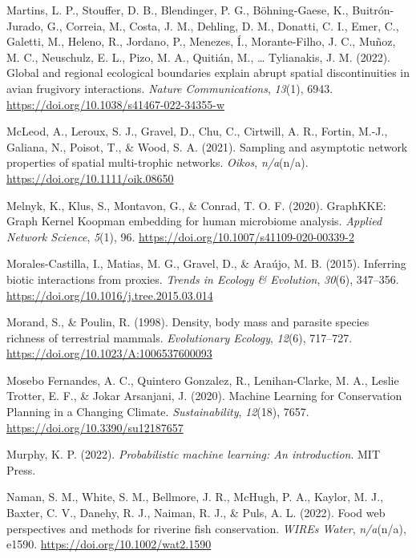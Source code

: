 \documentclass[10pt,oneside]{article}
\newlength{\cslhangindent}
\newenvironment{CSLReferences}[2] %
 {%
  \setlength{\parindent}{0pt}
  \ifodd #1 \everypar{\setlength{\hangindent}{\cslhangindent}}\ignorespaces\fi
  \ifnum #2 > 0
  \setlength{\parskip}{#2\baselineskip}
  \fi
 }%
 {}
\begin{document}
\begin{CSLReferences}{1}{0}
\leavevmode{}%
Martins, L. P., Stouffer, D. B., Blendinger, P. G., Böhning-Gaese, K.,
Buitrón-Jurado, G., Correia, M., Costa, J. M., Dehling, D. M., Donatti,
C. I., Emer, C., Galetti, M., Heleno, R., Jordano, P., Menezes, Í.,
Morante-Filho, J. C., Muñoz, M. C., Neuschulz, E. L., Pizo, M. A.,
Quitián, M., \ldots{} Tylianakis, J. M. (2022). Global and regional
ecological boundaries explain abrupt spatial discontinuities in avian
frugivory interactions. \emph{Nature Communications}, \emph{13}(1),
6943. \url{https://doi.org/10.1038/s41467-022-34355-w}

\leavevmode{}%
McLeod, A., Leroux, S. J., Gravel, D., Chu, C., Cirtwill, A. R., Fortin,
M.-J., Galiana, N., Poisot, T., \& Wood, S. A. (2021). Sampling and
asymptotic network properties of spatial multi-trophic networks.
\emph{Oikos}, \emph{n/a}(n/a). \url{https://doi.org/10.1111/oik.08650}

\leavevmode{}%
Melnyk, K., Klus, S., Montavon, G., \& Conrad, T. O. F. (2020).
GraphKKE: Graph Kernel Koopman embedding for human microbiome analysis.
\emph{Applied Network Science}, \emph{5}(1), 96.
\url{https://doi.org/10.1007/s41109-020-00339-2}

\leavevmode{}%
Morales-Castilla, I., Matias, M. G., Gravel, D., \& Araújo, M. B.
(2015). Inferring biotic interactions from proxies. \emph{Trends in
Ecology \& Evolution}, \emph{30}(6), 347--356.
\url{https://doi.org/10.1016/j.tree.2015.03.014}

\leavevmode{}%
Morand, S., \& Poulin, R. (1998). Density, body mass and parasite
species richness of terrestrial mammals. \emph{Evolutionary Ecology},
\emph{12}(6), 717--727. \url{https://doi.org/10.1023/A:1006537600093}

\leavevmode{}%
Mosebo Fernandes, A. C., Quintero Gonzalez, R., Lenihan-Clarke, M. A.,
Leslie Trotter, E. F., \& Jokar Arsanjani, J. (2020). Machine Learning
for Conservation Planning in a Changing Climate. \emph{Sustainability},
\emph{12}(18), 7657. \url{https://doi.org/10.3390/su12187657}

\leavevmode{}%
Murphy, K. P. (2022). \emph{Probabilistic machine learning: An
introduction}. MIT Press.

\leavevmode{}%
Naman, S. M., White, S. M., Bellmore, J. R., McHugh, P. A., Kaylor, M.
J., Baxter, C. V., Danehy, R. J., Naiman, R. J., \& Puls, A. L. (2022).
Food web perspectives and methods for riverine fish conservation.
\emph{WIREs Water}, \emph{n/a}(n/a), e1590.
\url{https://doi.org/10.1002/wat2.1590}


\end{CSLReferences}
\end{document}
